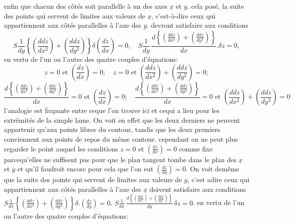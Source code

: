 \documentclass[11pt,a4paper]{article}
\begin{document}

enfin que chacun des côtés soit parallelle à un des axes  $\underline{x}$ et $y$.
cela posé, la suite des points qui servent de limites aux
valeurs de $\underline{x}$, c'est-à-dire ceux qui appartiennent aux côtés
parallelles à l'axe des $y$. devront satisfaire aux conditions
\[ S\frac{1}{dy}\left\{\left(\frac{ddz}{dx^2}\right) + \left(\frac{ddz}{dy^2}\right)\right\}\delta\left(\frac{dz}{dx}\right) = 0, \quad S\frac{1}{dy}\,\frac{d\left\{\left(\frac{ddz}{dx^2}\right) + \left(\frac{ddz}{dy^2}\right)\right\}}{dx}.\delta z = 0, \]
en vertu de l'un ou l'autre des quatre couples d'équations:
\[ z=0 \text{ et } \left(\frac{dz}{dx}\right)=0; \quad z=0 \text{ et } \left(\frac{ddz}{dx^2}\right) + \left(\frac{ddz}{dy^2}\right) = 0; \]
\[ \frac{d\left\{\left(\frac{ddz}{dx^2}\right) + \left(\frac{ddz}{dy^2}\right)\right\}}{dx} = 0 \text{ et } \left(\frac{dz}{dx}\right)=0; \quad \frac{d\left\{\left(\frac{ddz}{dx^2}\right) + \left(\frac{ddz}{dy^2}\right)\right\}}{dx} = 0 \text{ et } \left(\frac{ddz}{dx^2}\right) + \left(\frac{ddz}{dy^2}\right) = 0 \]
l'analogie est frapante entre ceque l'on trouve ici et
cequi a lieu pour les extrêmités de la simple lame.
On voit en effet que les deux derniers   ne peuvent
appartenir qu'aux points libres du contour, tandis que
les deux premiers conviennent aux points de repos du
même contour. cependant on ne peut plus regarder
le point auquel  les conditions $z=0$ et $\left(\frac{dz}{dx}\right)=0$
comme fixe parcequ'elles ne suffisent pas pour que le
plan tangent tombe dans le plan des $\underline{x}$ et $y$ et qu'il
faudroit encore pour cela que l'on eut $\left(\frac{dz}{dy}\right)=0$.
On voit demême que la suite des points qui servent
de limites aux valeurs de $y$, c'est adire ceux qui appartiennent
aux côtés parallelles à l'axe des $\underline{x}$ doivent satisfaire
aux conditions $S\frac{1}{dx}\left\{\left(\frac{ddz}{dx^2}\right) + \left(\frac{ddz}{dy^2}\right)\right\}\delta.\left(\frac{dz}{dy}\right) = 0$, $S\frac{1}{dx}\,\frac{d\left\{\left(\frac{ddz}{dx^2}\right) + \left(\frac{ddz}{dy^2}\right)\right\}}{dy}\,\delta z = 0$.
en vertu de l'un ou l'autre des quatre couples d'équations:
\end{document}
